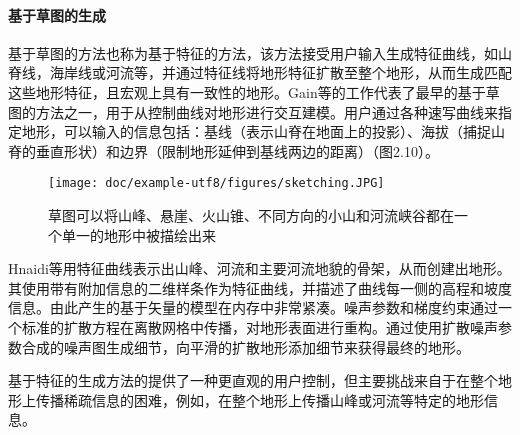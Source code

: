 \paragraph{基于草图的生成}
基于草图的方法也称为基于特征的方法，该方法接受用户输入生成特征曲线，如山脊线，海岸线或河流等，并通过特征线将地形特征扩散至整个地形，从而生成匹配这些地形特征，且宏观上具有一致性的地形。Gain等\supercite{gain-sketching}的工作代表了最早的基于草图的方法之一，用于从控制曲线对地形进行交互建模。用户通过各种速写曲线来指定地形，可以输入的信息包括：基线（表示山脊在地面上的投影）、海拔（捕捉山脊的垂直形状）和边界（限制地形延伸到基线两边的距离）（图2.10）。\par
\begin{figure}[htbp]
\centering
\texttt{[image: doc/example-utf8/figures/sketching.JPG]}
\caption{草图可以将山峰、悬崖、火山锥、不同方向的小山和河流峡谷都在一个单一的地形中被描绘出来\supercite{gain-sketching}}
\end{figure}
Hnaidi等\supercite{HnaidiFeature}用特征曲线表示出山峰、河流和主要河流地貌的骨架，从而创建出地形。其使用带有附加信息的二维样条作为特征曲线，并描述了曲线每一侧的高程和坡度信息。由此产生的基于矢量的模型在内存中非常紧凑。噪声参数和梯度约束通过一个标准的扩散方程在离散网格中传播，对地形表面进行重构。通过使用扩散噪声参数合成的噪声图生成细节，向平滑的扩散地形添加细节来获得最终的地形。\par
基于特征的生成方法的提供了一种更直观的用户控制，但主要挑战来自于在整个地形上传播稀疏信息的困难，例如，在整个地形上传播山峰或河流等特定的地形信息。

